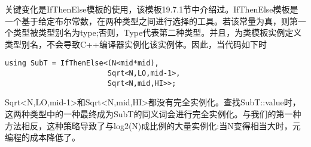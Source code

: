 关键变化是IfThenElse模板的使用，该模板19.7.1节中介绍过。IfThenElse模板是一个基于给定布尔常数，在两种类型之间进行选择的工具。若该常量为真，则第一个类型被类型别名为type;否则，Type代表第二种类型。并且，为类模板实例定义类型别名，不会导致C++编译器实例化该实例体。因此，当代码如下时

\begin{lstlisting}[style=styleCXX]
using SubT = IfThenElse<(N<mid*mid),
						Sqrt<N,LO,mid-1>,
						Sqrt<N,mid,HI>>;
\end{lstlisting}

Sqrt<N,LO,mid-1>和Sqrt<N,mid,HI>都没有完全实例化。查找SubT::value时，这两种类型中的一种最终成为SubT的同义词会进行完全实例化。与我们的第一种方法相反，这种策略导致了与log2(N)成比例的大量实例化:当N变得相当大时，元编程的成本降低了。















